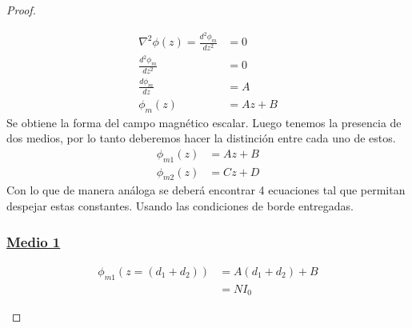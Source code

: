 \begin{proof}
\begin{enumerate}
    \begin{align}
        \nabla^{2} \phi(z) = \frac{d^{2} \phi_{m}}{dz^{2}} &= 0\\
        \frac{d^{2} \phi_{m}}{dz^{2}} &= 0\\
        \frac{d\phi_{m}}{dz} &= A\\
        \phi_{m}(z) &= Az + B
    \end{align}
    Se obtiene la forma del campo magnético escalar. Luego tenemos la presencia de dos medios, por lo tanto deberemos hacer la distinción entre cada uno de estos.
    \begin{align}
        \phi_{m1}(z) &= Az + B \\
        \phi_{m2}(z) &= Cz + D 
    \end{align}
    Con lo que de manera análoga se deberá encontrar 4 ecuaciones tal que permitan despejar estas constantes. Usando las condiciones de borde entregadas.
    \subsubsection*{\underline{Medio 1}}
    \begin{align}
        \phi_{m1}(z=(d_{1} + d_{2}))  &= A(d_{1} + d_{2}) + B \\&= N I_{0} 
    \end{align}

\end{enumerate}
\end{proof}
